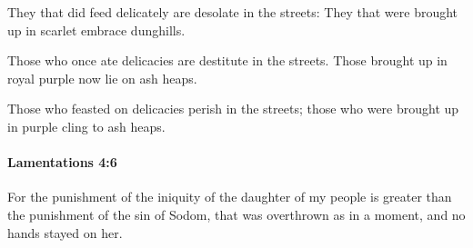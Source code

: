 			\begin{versebox}
					\item[BHS] 
					\item[LXX] 
					\item[ASV] They that did feed delicately are desolate in the streets: They that were brought up in scarlet embrace dunghills.
					\item[NIV] Those who once ate delicacies are destitute in the streets. Those brought up in royal purple now lie on ash heaps.
					\item[NRSV] Those who feasted on delicacies perish in the streets; those who were brought up in purple cling to ash heaps.
			\end{versebox}

		\paragraph{Lamentations 4:6} %
			\label{LAMENTATIONS-4-6}

			For the punishment of the iniquity of the daughter of my people is greater than the punishment of the sin of Sodom, that was overthrown as in a moment, and no hands stayed on her.

